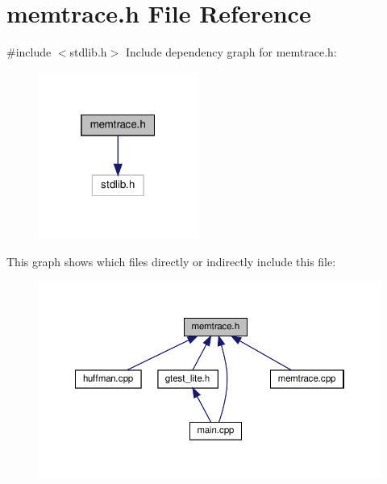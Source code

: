\section{memtrace.\+h File Reference}
\label{memtrace_8h}
{\ttfamily \#include $<$stdlib.\+h$>$}\newline
Include dependency graph for memtrace.\+h\+:
\nopagebreak
\begin{figure}[H]
\begin{center}
\leavevmode
\includegraphics[width=148pt]{memtrace_8h__incl}
\end{center}
\end{figure}
This graph shows which files directly or indirectly include this file\+:
\nopagebreak
\begin{figure}[H]
\begin{center}
\leavevmode
\includegraphics[width=350pt]{memtrace_8h__dep__incl}
\end{center}
\end{figure}
